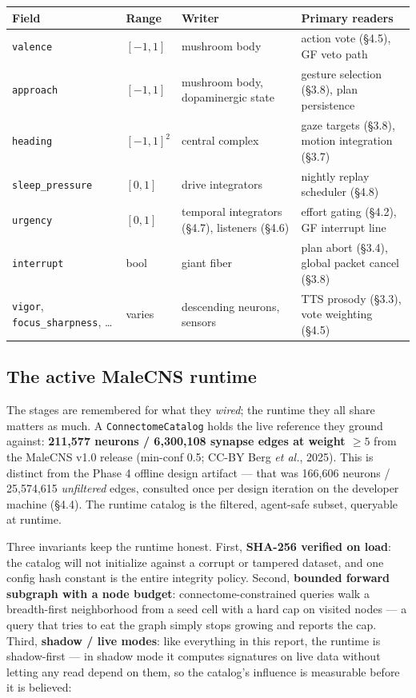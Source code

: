 \documentclass[11pt]{article}
\begin{document}
{\small
{}
\begin{longtable}{@{}>{\raggedright\arraybackslash}p{} >{\raggedright\arraybackslash}p{} >{\raggedright\arraybackslash}p{} >{\raggedright\arraybackslash}p{}@{}}
\toprule
\textbf{Field} & \textbf{Range} & \textbf{Writer} & \textbf{Primary readers} \\
\midrule
\texttt{valence} & \([-1, 1]\) & mushroom body & action vote (§4.5), GF veto path \\
\texttt{approach} & \([-1, 1]\) & mushroom body, dopaminergic state & gesture selection (§3.8), plan persistence \\
\texttt{heading} & \([-1,1]^2\) & central complex & gaze targets (§3.8), motion integration (§3.7) \\
\texttt{sleep\_pressure} & \([0, 1]\) & drive integrators & nightly replay scheduler (§4.8) \\
\texttt{urgency} & \([0, 1]\) & temporal integrators (§4.7), listeners (§4.6) & effort gating (§4.2), GF interrupt line \\
\texttt{interrupt} & bool & giant fiber & plan abort (§3.4), global packet cancel (§3.8) \\
\texttt{vigor}, \texttt{focus\_sharpness}, … & varies & descending neurons, sensors & TTS prosody (§3.3), vote weighting (§4.5) \\
\bottomrule
\end{longtable}
}

\subsection{The active MaleCNS runtime}

The stages are remembered for what they \emph{wired}; the runtime they all share matters as much. A \texttt{ConnectomeCatalog} holds the live reference they ground against: \textbf{211,577 neurons / 6,300,108 synapse edges at weight \(\ge 5\)} from the MaleCNS v1.0 release (min-conf 0.5; CC-BY Berg \emph{et al.}, 2025). This is distinct from the Phase 4 offline design artifact — that was 166,606 neurons / 25,574,615 \emph{unfiltered} edges, consulted once per design iteration on the developer machine (§4.4). The runtime catalog is the filtered, agent-safe subset, queryable at runtime.

Three invariants keep the runtime honest. First, \textbf{SHA-256 verified on load}: the catalog will not initialize against a corrupt or tampered dataset, and one config hash constant is the entire integrity policy. Second, \textbf{bounded forward subgraph with a node budget}: connectome-constrained queries walk a breadth-first neighborhood from a seed cell with a hard cap on visited nodes — a query that tries to eat the graph simply stops growing and reports the cap. Third, \textbf{shadow / live modes}: like everything in this report, the runtime is shadow-first — in shadow mode it computes signatures on live data without letting any read depend on them, so the catalog's influence is measurable before it is believed:
\end{document}
